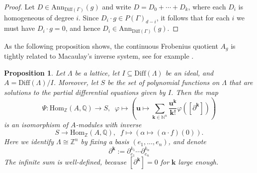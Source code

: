 \documentclass[oneside]{amsart}
\theoremstyle{plain}
\newtheorem{proposition}[theorem]{Proposition}
\theoremstyle{definition}
\newcommand{\Z}{{\mathbb{Z}}}
\newcommand{\N}{{\mathbb{N}}}
\newcommand{\Q}{{\mathbb{Q}}}
\newcommand{\Ann}{{\mathrm{Ann}}}
\newcommand{\Diff}{{\mathrm{Diff}}}
\newcommand{\Hom}{{\mathrm{Hom}}}
\begin{document}
\begin{proof}
    Let $D \in \Ann_{\Diff(\Gamma)}(g)$ and write $D = D_0 + \cdots + D_k$, where each $D_i$ is homogeneous of degree $i$. Since $D_i \cdot g \in P(\Gamma)_{d - i}$, it follows that for each $i$ we must have $D_i\cdot g = 0$, and hence $D_i \in \Ann_{\Diff(\Gamma)}(g)$.
\end{proof}

As the following proposition shows, the continuous Frobenius quotient $A_g$ is tightly related to Macaulay's inverse system, see for example \cite{iarrobino1999}.
\begin{proposition}
\label{prop:solution set to differential equation}
Let $\Lambda$ be a lattice, let $I\subseteq \Diff(\Lambda)$ be an ideal, and $A=
\Diff(\Lambda)/I$. Moreover, let $S$ 
be the set of polynomial functions on $\Lambda$ that are solutions to the partial differential equations given by $I$. Then the map
\[
    \Psi: \Hom_\Z(A,\Q) \to S, \;\; \varphi\mapsto
    \left( \mathbf{u} \mapsto 
    \sum_{\mathbf{k} \in \N^n} \frac{\mathbf{u}^{\mathbf{k}}}{\mathbf{k}!} \varphi([\partial^{\mathbf{k}}]) \right)
\]
is an isomorphism of $A$-modules with inverse
\[
    S \to \Hom_\Z(A,\Q),\;\; f\mapsto (\alpha \mapsto (\alpha \cdot f)(0)).
\]
Here we identify $\Lambda \cong \Z^n$ by fixing a basis $(e_1,\dots, e_n)$, and denote
\[
    \partial^\mathbf{k} := \partial_{e_1}^{k_1} \cdots \partial_{e_n}^{k_n}
\]
The infinite sum is well-defined, because $[\partial^\mathbf{k}] = 0$ for $\mathbf{k}$ large enough.
\end{proposition}
\end{document}
